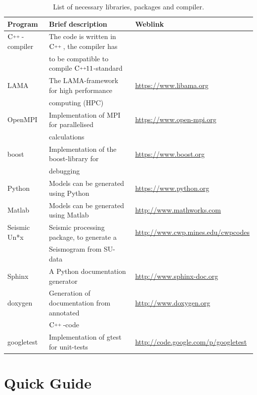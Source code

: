 \documentclass[pdftex,a4paper,parskip,listof=totoc,bibliography=totoc,onehalfspacing,12pt]{scrreprt}
\newcommand{\CC}[1][]{$\text{C\hspace{0ex}}^{_{_{_{++}}}}					%
                      \ifthenelse{\equal{#1}{}}{}{\text{\hspace{-.625ex}#1}}$}
\begin{document}
\begin{table}[h!]
\caption{List of necessary libraries, packages and compiler.}\label{tab:pack}
\centering
\begin{adjustbox}{width=1\textwidth,center=\textwidth}
	\begin{tabular}{lll}
	\toprule
	Program & Brief description & Weblink \\
	\midrule
	\CC-compiler	& The code is written in \CC[], the compiler	has 		& \\
										& to be compatible to compile \CC[11]-standard					& \\
LAMA 				& The LAMA-framework for high performance			& \url{https://www.libama.org} \\
	& computing 	(HPC)							    & \\
	\midrule
	OpenMPI			& Implementation of MPI for parallelised  			& \url{https://www.open-mpi.org} \\
										& calculations						& \\
		boost					& Implementation of the boost-library	for  				& \url{https://www.boost.org}		\\
										& debugging																& \\										
	Python				& Models can be generated using Python 		& \url{https://www.python.org}\\
	Matlab				& Models can be generated using Matlab		& \url{http://www.mathworks.com}\\	
	
	
	Seismic Un*x	& 	Seismic processing package, to generate a  	& \url{http://www.cwp.mines.edu/cwpcodes}\\ 
											&  Seismogram from SU-data  															& \\
	
	
	Sphinx				& 	A Python documentation generator 							& \url{http://www.sphinx-doc.org}\\
	doxygen			& 	Generation of documentation from annotated				& \url{http://www.doxygen.org}\\
										& \CC-code 															& \\
	googletest & Implementation of gtest for unit-tests & \url{http://code.google.com/p/googletest}\\
	\bottomrule
	\end{tabular}
	\end{adjustbox}
\end{table}

\section{Quick Guide}
\end{document}
